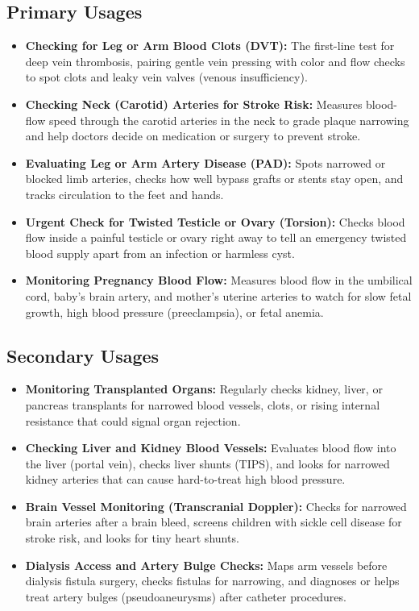 \subsection{Primary Usages}
\begin{itemize}
\item \textbf{Checking for Leg or Arm Blood Clots (DVT):} The first-line test for deep vein thrombosis, pairing gentle vein pressing with color and flow checks to spot clots and leaky vein valves (venous insufficiency).
\item \textbf{Checking Neck (Carotid) Arteries for Stroke Risk:} Measures blood-flow speed through the carotid arteries in the neck to grade plaque narrowing and help doctors decide on medication or surgery to prevent stroke.
\item \textbf{Evaluating Leg or Arm Artery Disease (PAD):} Spots narrowed or blocked limb arteries, checks how well bypass grafts or stents stay open, and tracks circulation to the feet and hands.
\item \textbf{Urgent Check for Twisted Testicle or Ovary (Torsion):} Checks blood flow inside a painful testicle or ovary right away to tell an emergency twisted blood supply apart from an infection or harmless cyst.
\item \textbf{Monitoring Pregnancy Blood Flow:} Measures blood flow in the umbilical cord, baby's brain artery, and mother's uterine arteries to watch for slow fetal growth, high blood pressure (preeclampsia), or fetal anemia.
\end{itemize}

\subsection{Secondary Usages}
\begin{itemize}
\item \textbf{Monitoring Transplanted Organs:} Regularly checks kidney, liver, or pancreas transplants for narrowed blood vessels, clots, or rising internal resistance that could signal organ rejection.
\item \textbf{Checking Liver and Kidney Blood Vessels:} Evaluates blood flow into the liver (portal vein), checks liver shunts (TIPS), and looks for narrowed kidney arteries that can cause hard-to-treat high blood pressure.
\item \textbf{Brain Vessel Monitoring (Transcranial Doppler):} Checks for narrowed brain arteries after a brain bleed, screens children with sickle cell disease for stroke risk, and looks for tiny heart shunts.
\item \textbf{Dialysis Access and Artery Bulge Checks:} Maps arm vessels before dialysis fistula surgery, checks fistulas for narrowing, and diagnoses or helps treat artery bulges (pseudoaneurysms) after catheter procedures.
\end{itemize}

